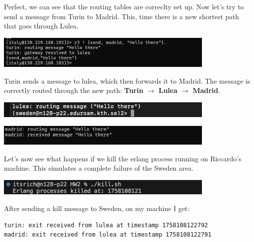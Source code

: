 \documentclass[a4paper, 11pt]{article}
\begin{document}
Perfect, we can see that the routing tables are correclty set up. Now let's try to send a message from Turin to Madrid. This, time there is a new shortest path that goes through Lulea.

\begin{center}
\includegraphics[width=0.8\textwidth]{screenshots/initial_message_routing_to_lulea.png}
\end{center}

Turin sends a message to lulea, which then forwards it to Madrid. The message is correctly routed through the new path: \textbf{Turin} $\to$ \textbf{Lulea} $\to$ \textbf{Madrid}.

\begin{center}
\includegraphics[width=0.8\textwidth]{screenshots/Message_Routing_to_Madrid_From_Lullea.png}
\end{center}

\begin{center}
\includegraphics[width=0.8\textwidth]{screenshots/madrid_receives_from_lulea.png}
\end{center}

Let's now see what happens if we kill the erlang process running on Riccardo's machine. This simulates a complete failure of the Sweden area.

\begin{center}
\includegraphics[width=0.8\textwidth]{screenshots/Initial_kill.png}
\end{center}

After sending a kill message to Sweden, on my machine I get:

\begin{verbatim}
turin: exit received from lulea at timestamp 1758108122792
madrid: exit received from lulea at timestamp 1758108122791
\end{verbatim}
\end{document}
